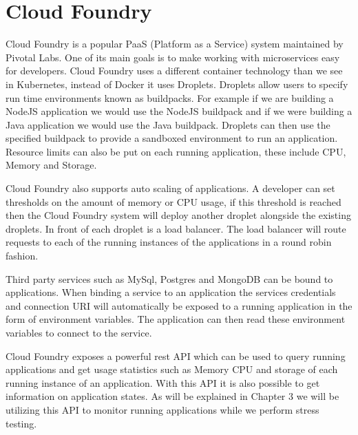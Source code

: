 \section{Cloud Foundry}

Cloud Foundry is a popular PaaS (Platform as a Service) system maintained by Pivotal Labs. One of its main goals is to make working with microservices easy for developers. Cloud Foundry uses a different container technology than we see in Kubernetes, instead of Docker it uses Droplets. Droplets allow users to specify run time environments known as buildpacks. For example if we are building a NodeJS application we would use the NodeJS buildpack and if we were building a Java application we would use the Java buildpack. Droplets can then use the specified buildpack to provide a sandboxed environment to run an application. Resource limits can also be put on each running application, these include CPU, Memory and Storage.

Cloud Foundry also supports auto scaling of applications. A developer can set thresholds on the amount of memory or CPU usage, if this threshold is reached then the Cloud Foundry system will deploy another droplet alongside the existing droplets. In front of each droplet is a load balancer. The load balancer will route requests to each of the running instances of the applications in a round robin fashion.

Third party services such as MySql, Postgres and MongoDB can be bound to applications. When binding a service to an application the services credentials and connection URI will automatically be exposed to a running application in the form of environment variables. The application can then read these environment variables to connect to the service.

Cloud Foundry exposes a powerful rest API which can be used to query running applications and get usage statistics such as Memory CPU and storage of each running instance of an application. With this API it is also possible to get information on application states. As will be explained in Chapter 3 we will be utilizing this API to monitor running applications while we perform stress testing.